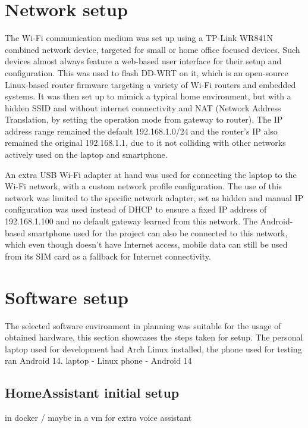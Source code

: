\section{Network setup}

The Wi-Fi communication medium was set up using a TP-Link WR841N combined network device, targeted for small or home office focused devices. Such devices almost always feature a web-based user interface for their setup and configuration. This was used to flash DD-WRT on it, which is an open-source Linux-based router firmware targeting a variety of Wi-Fi routers and embedded systems. \cite{DDWRTHomepage} It was then set up to mimick a typical home environment, but with a hidden SSID and without internet connectivity and NAT (Network Address Translation, by setting the operation mode from gateway to router). The IP address range remained the default 192.168.1.0/24 and the router's IP also remained the original 192.168.1.1, due to it not colliding with other networks actively used on the laptop and smartphone.

An extra USB Wi-Fi adapter at hand was used for connecting the laptop to the Wi-Fi network, with a custom network profile configuration. The use of this network was limited to the specific network adapter, set as hidden and manual IP configuration was used instead of DHCP to ensure a fixed IP address of 192.168.1.100 and no default gateway learned from this network. The Android-based smartphone used for the project can also be connected to this network, which even though doesn't have Internet access, mobile data can still be used from its SIM card as a fallback for Internet connectivity.

\section{Software setup}

The selected software environment in planning was suitable for the usage of obtained hardware, this section showcases the steps taken for setup. The personal laptop used for development had Arch Linux installed, the phone used for testing ran Android 14. 
laptop - Linux
phone - Android 14

\subsection{HomeAssistant initial setup}

in docker / maybe in a vm for extra voice assistant

